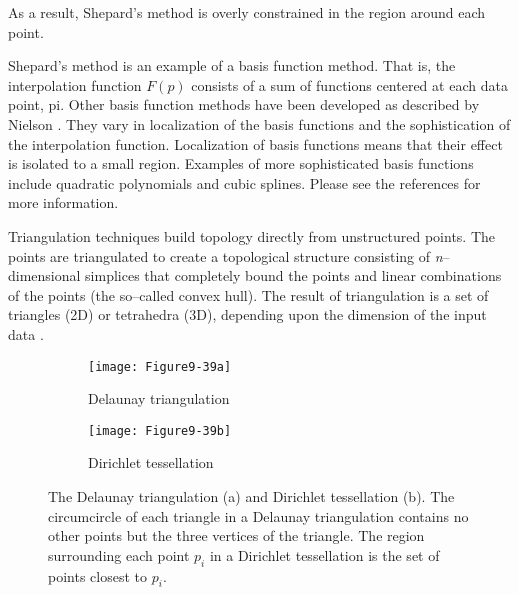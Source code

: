 \begin{description}[leftmargin=0cm,labelindent=0cm]
As a result, Shepard's method is overly constrained in the region around each point.

Shepard's method is an example of a basis function method. That is, the interpolation function $F(p)$ consists of a sum of functions centered at each data point, pi. Other basis function methods have been developed as described by Nielson \cite{Nielson91a}. They vary in localization of the basis functions and the sophistication of the interpolation function. Localization of basis functions means that their effect is isolated to a small region. Examples of more sophisticated basis functions include quadratic polynomials and cubic splines. Please see the references for more information.

\item[Triangulation techniques.]
Triangulation techniques build topology directly from unstructured points. The points are triangulated to create a topological structure consisting of \emph{n}--dimensional simplices that completely bound the points and linear combinations of the points (the so--called convex hull). The result of triangulation is a set of triangles (2D) or tetrahedra (3D), depending upon the dimension of the input data \cite{Lawson86}.

\begin{figure}[htb]
    \centering
	\begin{subfigure}[h]{0.48\linewidth}
		\texttt{[image: Figure9-39a]}
		\captionsetup{justification=centering}
		\caption{Delaunay triangulation}
		\label{fig:Figure9-39a}
	\end{subfigure}
	\hfill
	\begin{subfigure}[h]{0.48\linewidth}
		\texttt{[image: Figure9-39b]}
		\captionsetup{justification=centering}
		\caption{Dirichlet tessellation}
		\label{fig:Figure9-39b}
	\end{subfigure}
	\caption{The Delaunay triangulation (a) and Dirichlet tessellation (b). The circumcircle of each triangle in a Delaunay triangulation contains no other points but the three vertices of the triangle. The region surrounding each point $p_i$ in a Dirichlet tessellation is the set of points closest to $p_i$.}\label{fig:Figure9-39}
\end{figure}


\end{description}

